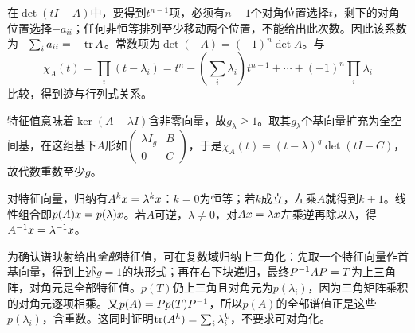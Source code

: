 \label{der:5-1}
在$\det(tI-A)$中，要得到$t^{n-1}$项，必须有$n-1$个对角位置选择$t$，剩下的对角位置选择$-a_{ii}$；任何非恒等排列至少移动两个位置，不能给出此次数。因此该系数为$-\sum_i a_{ii}=-\operatorname{tr} A$。常数项为$\det(-A)=(-1)^n\det A$。与
\[\chi_A(t)=\prod_i(t-\lambda_i)=t^n-\left(\sum_i\lambda_i\right)t^{n-1}+\cdots+(-1)^n\prod_i\lambda_i\]
比较，得到迹与行列式关系。

特征值意味着$\ker(A-\lambda I)$含非零向量，故$g_\lambda\ge1$。取其$g_\lambda$个基向量扩充为全空间基，在这组基下$A$形如$\begin{pmatrix}\lambda I_g&B\\0&C\end{pmatrix}$，于是$\chi_A(t)=(t-\lambda)^g\det(tI-C)$，故代数重数至少$g$。

对特征向量，归纳有$A^kx=\lambda^kx$：$k=0$为恒等；若$k$成立，左乘$A$就得到$k+1$。线性组合即$p(A)x=p(\lambda)x$。若$A$可逆，$\lambda\ne0$，对$Ax=\lambda x$左乘逆再除以$\lambda$，得$A^{-1}x=\lambda^{-1}x$。

为确认谱映射给出\emph{全部}特征值，可在复数域归纳上三角化：先取一个特征向量作首基向量，得到上述$g=1$的块形式；再在右下块递归，最终$P^{-1} AP=T$为上三角阵，对角元是全部特征值。$p(T)$仍上三角且对角元为$p(\lambda_i)$，因为三角矩阵乘积的对角元逐项相乘。又$p(A)=Pp(T)P^{-1}$，所以$p(A)$的全部谱值正是这些$p(\lambda_i)$，含重数。这同时证明$\operatorname{tr}(A^k)=\sum_i\lambda_i^k$，不要求可对角化。
